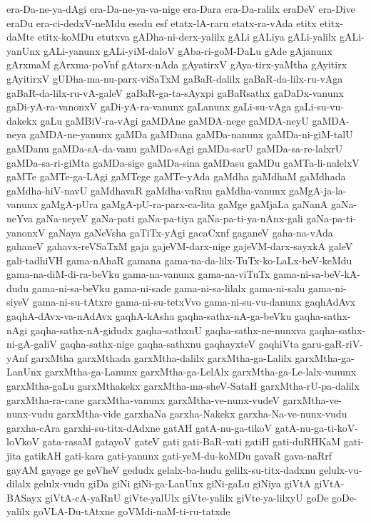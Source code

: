 {era-Da-ne-ya-dAgi
era-Da-ne-ya-va-nige
era-Dara
era-Da-ralilx
eraDeV
era-Dive
eraDu
era-ci-dedxV-neMdu
esedu
esf
etatx-lA-raru
etatx-ra-vAda
etitx
etitx-daMte
etitx-koMDu
etutxva
gADha-ni-derx-yalilx
gALi
gALiya
gALi-yalilx
gALi-yanUnx
gALi-yanunx
gALi-yiM-daloV
gAba-ri-goM-DaLu
gAde
gAjanunx
gArxmaM
gArxma-poVnf
gAtarx-nAda
gAyatirxV
gAya-tirx-yaMtha
gAyitirx
gAyitirxV
gUDha-ma-nu-parx-viSaTxM
gaBaR-dalilx
gaBaR-da-lilx-ru-vAga
gaBaR-da-lilx-ru-vA-galeV
gaBaR-ga-ta-sAyxpi
gaBaRsathx
gaDaDx-vanunx
gaDi-yA-ra-vanonxV
gaDi-yA-ra-vanunx
gaLanunx
gaLi-su-vAga
gaLi-su-vu-dakekx
gaLu
gaMBiV-ra-vAgi
gaMDAne
gaMDA-nege
gaMDA-neyU
gaMDA-neya
gaMDA-ne-yanunx
gaMDa
gaMDana
gaMDa-nanunx
gaMDa-ni-giM-talU
gaMDanu
gaMDa-sA-da-vanu
gaMDa-sAgi
gaMDa-sarU
gaMDa-sa-re-lalxrU
gaMDa-sa-ri-giMta
gaMDa-sige
gaMDa-sina
gaMDasu
gaMDu
gaMTa-li-nalelxV
gaMTe
gaMTe-ga-LAgi
gaMTege
gaMTe-yAda
gaMdha
gaMdhaM
gaMdhada
gaMdha-hiV-navU
gaMdhavaR
gaMdha-vaRnu
gaMdha-vanunx
gaMgA-ja-la-vanunx
gaMgA-pUra
gaMgA-pU-ra-parx-ca-lita
gaMge
gaMjaLa
gaNanA
gaNa-neYva
gaNa-neyeV
gaNa-pati
gaNa-pa-tiya
gaNa-pa-ti-ya-nAnx-gali
gaNa-pa-ti-yanonxV
gaNaya
gaNeVsha
gaTiTx-yAgi
gacaCxnf
gaganeV
gaha-na-vAda
gahaneV
gahavx-reVSaTxM
gaja
gajeVM-darx-nige
gajeVM-darx-sayxkA
galeV
gali-tadhiVH
gama-nAhaR
gamana
gama-na-da-lilx-TuTx-ko-LaLx-beV-keMdu
gama-na-diM-di-ra-beVku
gama-na-vanunx
gama-na-viTuTx
gama-ni-sa-beV-kA-dudu
gama-ni-sa-beVku
gama-ni-sade
gama-ni-sa-lilalx
gama-ni-salu
gama-ni-siyeV
gama-ni-su-tAtxre
gama-ni-su-tetxVvo
gama-ni-su-vu-danunx
gaqhAdAvx
gaqhA-dAvx-va-nAdAvx
gaqhA-kAsha
gaqha-sathx-nA-ga-beVku
gaqha-sathx-nAgi
gaqha-sathx-nA-gidudx
gaqha-sathxnU
gaqha-sathx-ne-nunxva
gaqha-sathx-ni-gA-galiV
gaqha-sathx-nige
gaqha-sathxnu
gaqhayxteV
gaqhiVta
garu-gaR-riV-yAnf
garxMtha
garxMthada
garxMtha-dalilx
garxMtha-ga-Lalilx
garxMtha-ga-LanUnx
garxMtha-ga-Lanunx
garxMtha-ga-LelAlx
garxMtha-ga-Le-lalx-vanunx
garxMtha-gaLu
garxMthakekx
garxMtha-ma-sheV-SataH
garxMtha-rU-pa-dalilx
garxMtha-ra-cane
garxMtha-vanunx
garxMtha-ve-nunx-vudeV
garxMtha-ve-nunx-vudu
garxMtha-vide
garxhaNa
garxha-Nakekx
garxha-Na-ve-nunx-vudu
garxha-cAra
garxhi-su-titx-dAdxne
gatAH
gatA-nu-ga-tikoV
gatA-nu-ga-ti-koV-loVkoV
gata-rasaM
gatayoV
gateV
gati
gati-BaR-vati
gatiH
gati-duRHKaM
gati-jita
gatikAH
gati-kara
gati-yanunx
gati-yeM-du-koMDu
gavaR
gava-naRrf
gayAM
gayage
ge
geVheV
gedudx
gelalx-ba-hudu
gelilx-su-titx-dadxnu
gelulx-vu-dilalx
gelulx-vudu
giDa
giNi
giNi-ga-LanUnx
giNi-gaLu
giNiya
giVtA
giVtA-BASayx
giVtA-cA-yaRnU
giVte-yalUlx
giVte-yalilx
giVte-ya-lilxyU
goDe
goDe-yalilx
goVLA-Du-tAtxne
goVMdi-naM-ti-ru-tatxde
}
